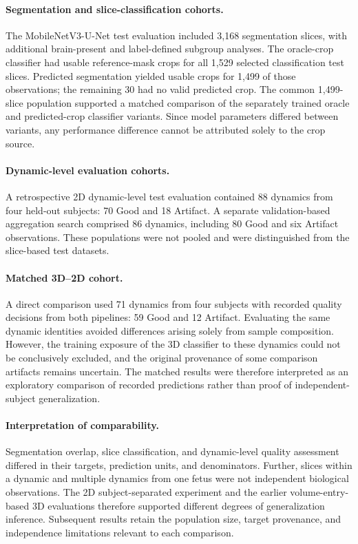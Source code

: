 \paragraph{Segmentation and slice-classification cohorts.}
The MobileNetV3-U-Net test evaluation included 3,168 segmentation slices, with additional brain-present and label-defined subgroup analyses. The oracle-crop classifier had usable reference-mask crops for all 1,529 selected classification test slices. Predicted segmentation yielded usable crops for 1,499 of those observations; the remaining 30 had no valid predicted crop. The common 1,499-slice population supported a matched comparison of the separately trained oracle and predicted-crop classifier variants. Since model parameters differed between variants, any performance difference cannot be attributed solely to the crop source.

\paragraph{Dynamic-level evaluation cohorts.}
A retrospective 2D dynamic-level test evaluation contained 88 dynamics from four held-out subjects: 70 Good and 18 Artifact. A separate validation-based aggregation search comprised 86 dynamics, including 80 Good and six Artifact observations. These populations were not pooled and were distinguished from the slice-based test datasets.

\paragraph{Matched 3D--2D cohort.}
A direct comparison used 71 dynamics from four subjects with recorded quality decisions from both pipelines: 59 Good and 12 Artifact. Evaluating the same dynamic identities avoided differences arising solely from sample composition. However, the training exposure of the 3D classifier to these dynamics could not be conclusively excluded, and the original provenance of some comparison artifacts remains uncertain. The matched results were therefore interpreted as an exploratory comparison of recorded predictions rather than proof of independent-subject generalization.

\paragraph{Interpretation of comparability.}
Segmentation overlap, slice classification, and dynamic-level quality assessment differed in their targets, prediction units, and denominators. Further, slices within a dynamic and multiple dynamics from one fetus were not independent biological observations. The 2D subject-separated experiment and the earlier volume-entry-based 3D evaluations therefore supported different degrees of generalization inference. Subsequent results retain the population size, target provenance, and independence limitations relevant to each comparison.

